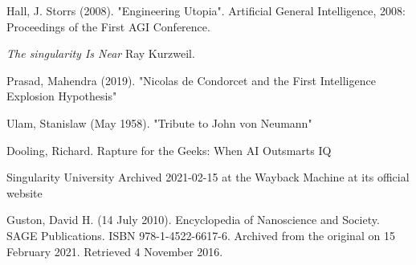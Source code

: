 \documentclass[a4paper]{article}
\begin{document}
\begin{thebibliography}{9}
 Hall, J. Storrs (2008). "Engineering Utopia". Artificial General Intelligence, 2008: Proceedings of the First AGI Conference.

 \textit{The singularity Is Near} Ray Kurzweil.

Prasad, Mahendra (2019). "Nicolas de Condorcet and the First Intelligence Explosion Hypothesis"

 Ulam, Stanislaw (May 1958). "Tribute to John von Neumann"

 Dooling, Richard. Rapture for the Geeks: When AI Outsmarts IQ

 Singularity University Archived 2021-02-15 at the Wayback Machine at its official website

 Guston, David H. (14 July 2010). Encyclopedia of Nanoscience and Society. SAGE Publications. ISBN 978-1-4522-6617-6. Archived from the original on 15 February 2021. Retrieved 4 November 2016.

\end{thebibliography}
\end{document}
